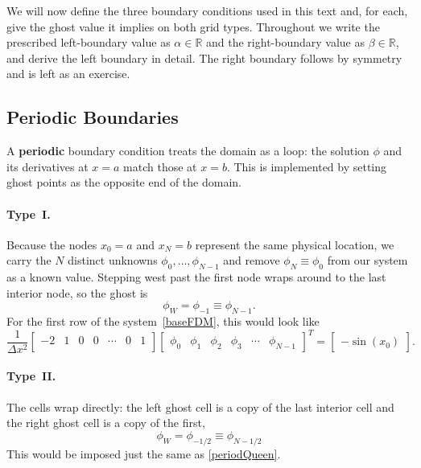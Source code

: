 We will now define the three boundary conditions used in this text and, for
each, give the ghost value it implies on both grid types. Throughout we
write the prescribed left-boundary value as $\alpha \in \mathbb{R}$ and the right-boundary
value as $\beta  \in \mathbb{R}$, and derive the left boundary in detail. The right
boundary follows by symmetry and is left as an exercise.

\subsection{Periodic Boundaries}
\label{sec:bc-periodic}

A \textbf{periodic} boundary condition treats the domain as a loop: the solution $\phi$
and its derivatives at $x=a$ match those at $x=b$. This is implemented by setting ghost points as the opposite end of the domain.
\\

\paragraph{Type~I.} Because the nodes $x_0=a$ and $x_N=b$ represent the same
physical location, we carry the $N$ distinct unknowns
$\phi_0,\dots,\phi_{N-1}$ and remove $\phi_N \equiv \phi_0$ from our system as a known value. Stepping
west past the first node wraps around to the last interior node, so the
ghost is
\begin{equation}
    \phi_W = \phi_{-1} \equiv \phi_{N-1}.
\end{equation}
For the first row of the system~\ref{baseFDM}, this would look like 
\begin{equation}
    \frac{1}{\Delta x^2}
    \begin{bmatrix}
        -2 & 1 & 0& 0& \cdots & 0 & 1\\
    \end{bmatrix}
    \begin{bmatrix}
        \phi_0 & \phi_1 &  \phi_2 & \phi_3 &  \cdots & \phi_{N-1}
    \end{bmatrix}^T
    =
    \begin{bmatrix}
        -\sin(x_0)
    \end{bmatrix}. \label{periodQueen}
\end{equation}


\paragraph{Type~II.} The cells wrap directly: the left ghost cell is a copy of
the last interior cell and the right ghost cell is a copy of the first,
\begin{equation}
    \phi_W = \phi_{-1/2} \equiv \phi_{N-1/2}
\end{equation}
This would be imposed just the same as \eqref{periodQueen}.
